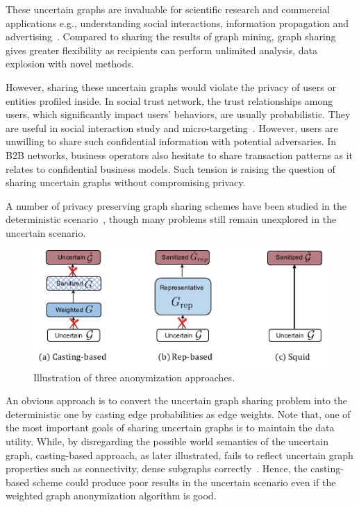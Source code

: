 These uncertain graphs are invaluable for scientific research and commercial applications e.g., understanding social interactions, information propagation and advertising~\cite{Kempe_Maximizing_2003,Cho_Friendship_2011}. 
Compared to sharing the results of graph mining, graph sharing gives greater flexibility as recipients can perform unlimited analysis, data explosion with novel methods.

However, sharing these uncertain graphs would violate the privacy of users or entities profiled inside. In social trust network, the trust relationships among users, which significantly impact users' behaviors, are usually probabilistic.  They are useful in social interaction study and micro-targeting~\cite{Kempe_Maximizing_2003}. However, users are unwilling to share such confidential information with potential adversaries. In B2B networks, business operators also hesitate to share transaction patterns as it relates to confidential business models. Such tension is raising the question of sharing uncertain graphs without compromising privacy. 

A number of privacy preserving graph sharing schemes have been studied in the deterministic scenario~\cite{Liu_Towards_2008,Ying_Randomizing_2008,Wang2011,Liu_Privacy_2009,Nguyen_Anonymizing_2015,Sala_Sharing_2011,Xiao_Differentially_2014,lee2011}, though many problems still remain unexplored in the uncertain scenario.
\begin{figure}[!htb]
  \centering
  \includegraphics[width=0.9\linewidth]{ill/methods.pdf}
  \caption{Illustration of three anonymization approaches.}
\end{figure}

An obvious approach is to convert the uncertain graph sharing problem into the deterministic one by casting edge probabilities as edge weights. 
Note that, one of the most important goals of sharing uncertain graphs is to maintain the data utility. 
While, by disregarding the possible world semantics of the uncertain graph, casting-based approach, as later illustrated, fails to reflect uncertain graph properties such as connectivity, dense subgraphs correctly~\cite{Zhao_Detecting_2014,Hua_Probabilistic_2010}. 
Hence, the casting-based scheme could produce poor results in the uncertain scenario even if the weighted graph anonymization algorithm is good. 


